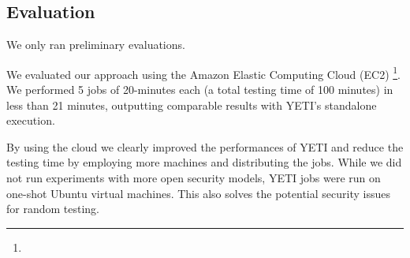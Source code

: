 \subsection{Evaluation}

We only ran preliminary evaluations.

We evaluated our approach using the Amazon Elastic Computing Cloud (EC2) \footnote{}.
We performed 5 jobs of 20-minutes each (a total testing time of 100 minutes) in less 
than 21 minutes, outputting comparable results with YETI's standalone execution.

By using the cloud we clearly improved the performances of YETI and reduce the testing time by 
employing more machines and distributing the jobs.
While we did not run experiments with more open security models, 
YETI jobs were run on one-shot Ubuntu virtual machines. This also solves
the potential security issues for random testing.
